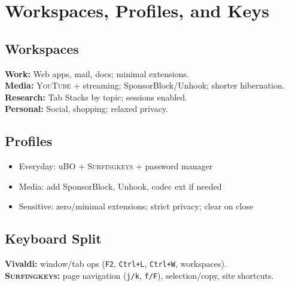\documentclass[10pt,a4paper,oneside]{book}
\newcommand{\youtube}{\textsc{YouTube}}
\newcommand{\surfingkeys}{\textsc{Surfingkeys}}
\newcommand{\keystroke}[1]{\texttt{\color{accentred}#1}}
\begin{document}
\chapter{Workspaces, Profiles, and Keys}
\section{Workspaces}
\begin{multicols}{2}
\textbf{Work:} Web apps, mail, docs; minimal extensions.\\
\textbf{Media:} \youtube{} + streaming; SponsorBlock/Unhook; shorter hibernation.\\
\textbf{Research:} Tab Stacks by topic; sessions enabled.\\
\textbf{Personal:} Social, shopping; relaxed privacy.
\end{multicols}

\section{Profiles}
\begin{itemize}
  \item Everyday: uBO + \surfingkeys{} + password manager
  \item Media: add SponsorBlock, Unhook, codec ext if needed
  \item Sensitive: zero/minimal extensions; strict privacy; clear on close
\end{itemize}

\section{Keyboard Split}
\textbf{Vivaldi:} window/tab ops (\keystroke{F2}, \keystroke{Ctrl+L}, \keystroke{Ctrl+W}, workspaces).\\
\textbf{\surfingkeys{}:} page navigation (\keystroke{j/k}, \keystroke{f/F}), selection/copy, site shortcuts.
\end{document}
